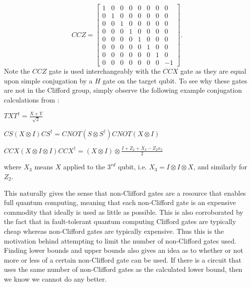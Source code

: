 \documentclass[12pt]{dalthesis}
\begin{document}
\begin{equation*}
CCZ = 
\begin{bmatrix}
1 & 0 & 0 & 0 & 0 & 0 & 0 & 0 \\
0 & 1 & 0 & 0 & 0 & 0 & 0 & 0 \\
0 & 0 & 1 & 0 & 0 & 0 & 0 & 0 \\
0 & 0 & 0 & 1 & 0 & 0 & 0 & 0 \\
0 & 0 & 0 & 0 & 1 & 0 & 0 & 0 \\
0 & 0 & 0 & 0 & 0 & 1 & 0 & 0 \\
0 & 0 & 0 & 0 & 0 & 0 & 1 & 0 \\
0 & 0 & 0 & 0 & 0 & 0 & 0 & -1 
\end{bmatrix}.
\end{equation*}
Note the $CCZ$ gate is used interchangeably with the $CCX$ gate as they are equal upon simple conjugation by a $H$ gate on the target qubit. To see why these gates are not in the Clifford group, simply observe the following example conjugation calculations from \cite{beverland2019lower}:
\begin{center}
$TXT^{\dag} = \frac{X+Y}{\sqrt{2}}$
\end{center}
\begin{center}
$CS(X \otimes I)CS^\dag = CNOT (S \otimes S^\dag)CNOT(X \otimes I)$
\end{center}
\begin{center}
$CCX(X \otimes I \otimes I) CCX^\dag = (X \otimes I) \otimes \frac{I+Z_2+X_3-Z_2x_3}{2}$
\end{center}
where $X_3$ means $X$ applied to the $3^{rd}$ qubit, i.e. $X_3 = I \otimes I \otimes X$, and similarly for $Z_2$.

This naturally gives the sense that non-Clifford gates are a resource that enables full quantum computing, meaning that each non-Clifford gate is an expensive commodity that ideally is used as little as possible. This is also corroborated by the fact that in fault-tolerant quantum computing Clifford gates are typically cheap whereas non-Clifford gates are typically expensive. Thus this is the motivation behind attempting to limit the number of non-Clifford gates used. Finding lower bounds and upper bounds also gives an idea as to whether or not more or less of a certain non-Clifford gate can be used. If there is a circuit that uses the same number of non-Clifford gates as the calculated lower bound, then we know we cannot do any better.
\end{document}
